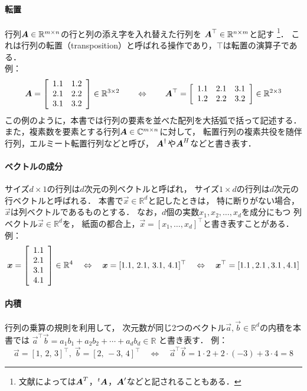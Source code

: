 \paragraph{転置}
行列$\mtr A\in\mathbb{R}^{m\times n}$の行と列の添え字を入れ替えた行列を
$\mtr A^\top\in\mathbb{R}^{n\times m}$と記す
\footnote{文献によっては$\mtr A^T$，${}^t\mtr A$，$\mtr A'$などと記されることもある．}．
これは行列の転置（transposition）と呼ばれる操作であり，$\top$は転置の演算子である．\\
例：
\[
\mtr A=\bmatrix{cc}{1.1 & 1.2\\ 2.1 & 2.2\\ 3.1 & 3.2}\in\mathbb{R}^{3\times 2}
\qquad\Leftrightarrow\qquad
\mtr A^\top=\bmatrix{ccc}{1.1 & 2.1 & 3.1\\ 1.2 & 2.2 & 3.2}\in\mathbb{R}^{2\times 3}
\]
この例のように，本書では行列の要素を並べた配列を大括弧で括って記述する．
%
また，複素数を要素とする行列$\mtr A\in\mathbb{C}^{m\times n}$に対して，
転置行列の複素共役を随伴行列，エルミート転置行列などと呼び，
$\mtr A^\dagger$や$\mtr A^H$などと書き表す．


\paragraph{ベクトルの成分}
サイズ$d\times 1$の行列は$d$次元の列ベクトルと呼ばれ，
サイズ$1\times d$の行列は$d$次元の行ベクトルと呼ばれる．
本書で$\vec x\in\mathbb{R}^d$と記したときは，
特に断りがない場合，$\vec x$は列ベクトルであるものとする．
なお，$d$個の実数$x_1,x_2,\dots,x_d$を成分にもつ
列ベクトル$\vec x\in\mathbb{R}^d$を，
紙面の都合上，$\vec x=[x_1,\dots,x_d]^\top$と書き表すことがある．\\
例：
\[
\vec x=\bmatrix{c}{1.1\\ 2.1\\ 3.1\\ 4.1}\in\mathbb{R}^4
\quad\Leftrightarrow\quad
\vec x=[1.1,\,2.1,\,3.1,\,4.1]^\top
\quad\Leftrightarrow\quad
\vec x^\top=[1.1\,,2.1\,,3.1\,,4.1]
\]


\paragraph{内積}
%
行列の乗算の規則を利用して，
次元数が同じ2つのベクトル$\vec a,\vec b\in\mathbb{R}^d$の内積を本書では
$\vec a^\top\vec b=a_1b_1+a_2b_2+\cdots+a_db_d\in\mathbb{R}$
と書き表す．
例：
\[
\vec a=[1,\,2,\,3]^\top,\;\vec b=[2,\,-3,\,4]^\top
\quad\Leftrightarrow\quad
\vec a^\top\vec b=1\cdot 2+2\cdot (-3)+3\cdot 4 = 8
\]



